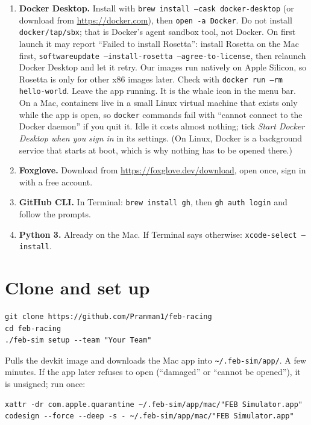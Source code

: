 \documentclass[11pt,a4paper]{article}
\begin{document}
\begin{enumerate}
  \item \textbf{Docker Desktop.} Install with \texttt{brew install --cask docker-desktop} (or download
  from \url{https://docker.com}), then \texttt{open -a Docker}. Do not install \texttt{docker/tap/sbx};
  that is Docker's agent sandbox tool, not Docker. On first launch it may report ``Failed to install
  Rosetta'': install Rosetta on the Mac first, \texttt{softwareupdate --install-rosetta
  --agree-to-license}, then relaunch Docker Desktop and let it retry. Our images run natively on Apple
  Silicon, so Rosetta is only for other x86 images later. Check with \texttt{docker run --rm hello-world}.
  Leave the app running.
  It is the whale icon in the menu bar. On a Mac, containers live in a small Linux virtual machine
  that exists only while the app is open, so \texttt{docker} commands fail with ``cannot connect to
  the Docker daemon'' if you quit it. Idle it costs almost nothing; tick \emph{Start Docker Desktop
  when you sign in} in its settings. (On Linux, Docker is a background service that starts at boot,
  which is why nothing has to be opened there.)
  \item \textbf{Foxglove.} Download from \url{https://foxglove.dev/download}, open once, sign in with a free account.
  \item \textbf{GitHub CLI.} In Terminal: \texttt{brew install gh}, then \texttt{gh auth login} and follow the prompts.
  \item \textbf{Python 3.} Already on the Mac. If Terminal says otherwise: \texttt{xcode-select --install}.
\end{enumerate}

\section{Clone and set up}

\begin{lstlisting}
git clone https://github.com/Pranman1/feb-racing
cd feb-racing
./feb-sim setup --team "Your Team"
\end{lstlisting}

Pulls the devkit image and downloads the Mac app into \texttt{\textasciitilde/.feb-sim/app/}.
A few minutes. If the app later refuses to open (``damaged'' or ``cannot be opened''), it is
unsigned; run once:

\begin{lstlisting}
xattr -dr com.apple.quarantine ~/.feb-sim/app/mac/"FEB Simulator.app"
codesign --force --deep -s - ~/.feb-sim/app/mac/"FEB Simulator.app"
\end{lstlisting}
\end{document}
